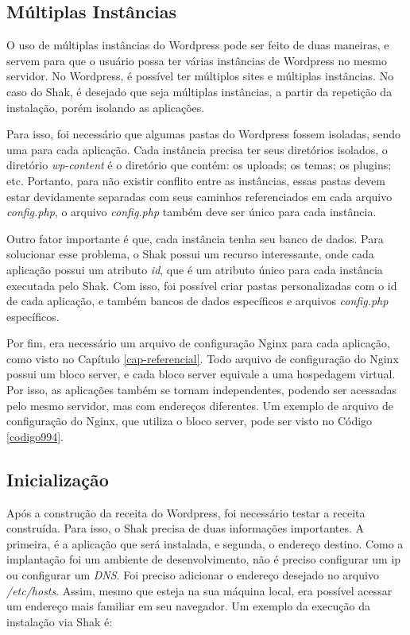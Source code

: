 \subsection{Múltiplas Instâncias}

O uso de múltiplas instâncias do Wordpress pode ser feito de duas maneiras, e servem
para que o usuário possa ter várias instâncias de Wordpress no mesmo servidor. No 
Wordpress, é possível ter múltiplos sites e múltiplas
instâncias. No caso do Shak, é desejado que seja múltiplas instâncias, a partir da
repetição da instalação, porém isolando as aplicações.
 
Para isso, foi necessário que algumas pastas do Wordpress
fossem isoladas, sendo uma para cada aplicação. Cada instância precisa
ter seus diretórios isolados, o diretório \textit{wp-content} é o diretório 
que contém: os uploads; os temas; os plugins; etc. Portanto, para não
existir conflito entre as instâncias, essas pastas devem estar devidamente separadas
com seus caminhos referenciados em cada arquivo \textit{config.php}, o arquivo 
\textit{config.php} também
deve ser único para cada instância. 

Outro fator importante é que, cada instância
tenha seu banco de dados. Para
solucionar esse problema, o Shak possui um recurso interessante, onde cada aplicação
possui um atributo \textit{id}, que é um atributo único para cada instância executada pelo
Shak. Com isso, foi possível criar pastas personalizadas com o id de cada aplicação, 
e também bancos de dados específicos e arquivos \textit{config.php} específicos.

Por fim, era necessário um arquivo de configuração Nginx para cada aplicação,
como visto no Capítulo \ref{cap-referencial}. Todo arquivo de configuração
do Nginx possui um bloco server, e cada bloco server equivale a uma hospedagem virtual. 
Por isso, as aplicações também se tornam independentes, podendo ser acessadas pelo 
mesmo servidor, mas com endereços diferentes. Um exemplo de arquivo de configuração
do Nginx, que utiliza o bloco server, pode ser visto no Código \ref{codigo994}.

\subsection{Inicialização}

Após a construção da receita do Wordpress, foi necessário testar a receita construída. 
Para isso, o Shak precisa de duas informações importantes. A primeira, é a aplicação
que será instalada, e segunda, o endereço destino. Como a implantação foi um ambiente de desenvolvimento,
não é preciso configurar um ip ou configurar um \textit{DNS}. Foi preciso adicionar o
endereço desejado no arquivo \textit{/etc/hosts}. Assim, mesmo que esteja na sua máquina local, 
era possível acessar um endereço mais familiar em seu navegador. Um exemplo da execução
da instalação via Shak é:


